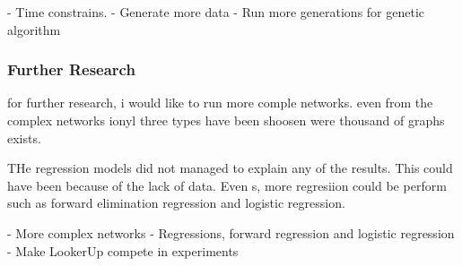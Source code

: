 - Time constrains.
- Generate more data
- Run more generations for genetic algorithm
\subsubsection{Further Research}

for further research, i would like to run more comple networks. even from the complex
networks ionyl three types have been shoosen were thousand of graphs exists.

THe regression models did not managed to explain any of the results. This could have been
because of the lack of data. Even s, more regresiion could be perform such as
forward elimination regression and logistic regression.

- More complex networks
- Regressions, forward regression and logistic regression
- Make LookerUp compete in experiments
